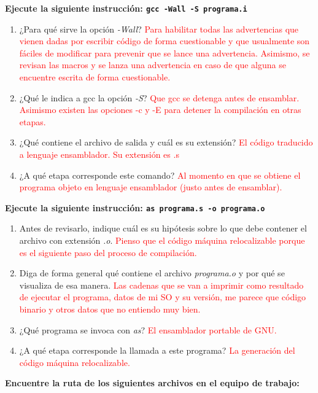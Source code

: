 \documentclass[11pt]{report}
\begin{document}
\textbf{Ejecute la siguiente instrucción: \texttt{gcc -Wall -S programa.i}}

\begin{enumerate}[label=\alph*.]
  \item ¿Para qué sirve la opción \textit{-Wall}? \textcolor{red}{Para habilitar todas las
    advertencias que vienen dadas por escribir código de forma cuestionable y que usualmente
    son fáciles de modificar para prevenir que se lance una advertencia. Asimismo, se revisan
    las macros y se lanza una advertencia en caso de que alguna se encuentre escrita de forma
    cuestionable.}
  \item ¿Qué le indica a gcc la opción \textit{-S}? \textcolor{red}{Que gcc se detenga antes
    de ensamblar. Asimismo existen las opciones -c y -E para detener la compilación en otras
    etapas.}
  \item ¿Qué contiene el archivo de salida y cuál es su extensión? \textcolor{red}{El código
    traducido a lenguaje ensamblador. Su extensión es .s}
  \item ¿A qué etapa corresponde este comando? \textcolor{red}{Al momento en que se obtiene
    el programa objeto en lenguaje ensamblador (justo antes de ensamblar).}
\end{enumerate}

\textbf{Ejecute la siguiente instrucción: \texttt{as programa.s -o programa.o}}

\begin{enumerate}[label=\alph*.]
  \item Antes de revisarlo, indique cuál es su hipótesis sobre lo que debe contener el archivo con extensión \textit{.o}.
    \textcolor{red}{Pienso que el código máquina relocalizable porque es el siguiente paso del proceso de
    compilación.}
  \item Diga de forma general qué contiene el archivo \textit{programa.o} y por qué se visualiza de esa manera.
    \textcolor{red}{Las cadenas que se van a imprimir como resultado de ejecutar el programa, datos
    de mi SO y su versión, me parece que código binario y otros datos que no entiendo muy bien.}
  \item ¿Qué programa se invoca con \textit{as}?
    \textcolor{red}{El ensamblador portable de GNU.}
  \item ¿A qué etapa corresponde la llamada a este programa?
    \textcolor{red}{La generación del código máquina relocalizable.}
\end{enumerate}

\textbf{Encuentre la ruta de los siguientes archivos en el equipo de trabajo:}
\end{document}
